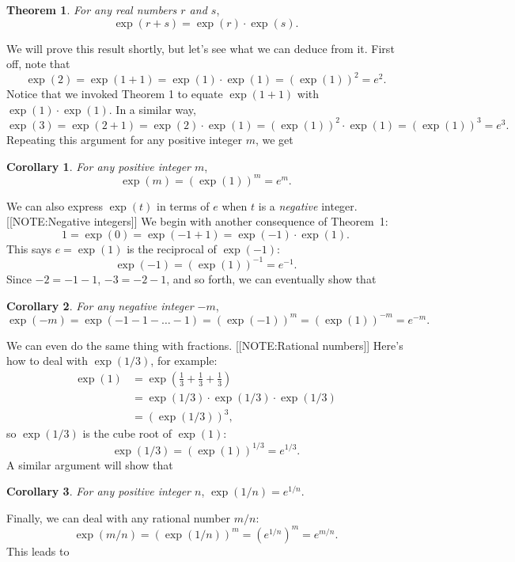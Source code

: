 {\bf Theorem 1}.  {\em For any real numbers\/ $r$ and\/ $s$},
	\[
\exp(r+s) = \exp(r) \cdot \exp(s).
\]

We will prove this result shortly, but let's see what we can deduce
from it.  First off, note that
\[
\exp(2) = \exp(1+1) = \exp(1) \cdot \exp(1) = 
		\left(\exp(1)\right)^2=e^2.
\]
Notice that we invoked Theorem 1 to equate $\exp(1+1)$ with $\exp(1) \cdot \exp(1)$.  In a similar way,
	\[
\exp(3) = \exp(2+1) = \exp(2) \cdot \exp(1) = 
		\left(\exp(1)\right)^2 \cdot \exp(1) = 
		\left(\exp(1)\right)^3=e^3.
\]
Repeating this argument for any positive integer $m$, we get



{\bf Corollary 1}.  {\em For any positive integer $m$},	\[
\exp(m) = \left(\exp(1)\right)^m = e^m.
\]

We can also express $\exp(t)$ in terms of $e $ when $t$ is a {\em
  negative\/} integer.
[[NOTE:Negative integers]]
We begin with another consequence of Theorem~1:
	\[
1 = \exp(0) = \exp(-1+1) = \exp(-1) \cdot \exp(1).
\]
This says $e = \exp(1)$ is the reciprocal of $\exp(-1)$:
	\[
\exp(-1) = \left(\exp(1)\right)^{-1} = e^{-1}.
\]
Since $-2 = -1 - 1$, $-3 = -2 - 1$, and so forth, we can eventually show that

\pagebreak



{\bf Corollary 2}.  {\em For any negative integer $-m$},	\[
\exp(-m) = \exp(-1-1-\ldots -1)=\left(\exp(-1)\right)^{m}=\left(\exp(1)\right)^{-m} = e^{-m}.
\]

	We can even do the same thing with fractions.  
	[[NOTE:Rational numbers]]
Here's how to deal with $\exp(1/3)$, for example:
	\begin{align*}
\exp(1) &= \exp\left(\tfrac{1}{3} 
		+ \tfrac{1}{3} + \tfrac{1}{3}\right)  \\
	&= \exp(1/3) \cdot \exp(1/3) \cdot \exp(1/3) \\
	&= \left( \exp(1/3) \right)^3,
	\end{align*}
so $\exp(1/3)$ is the cube root of $\exp(1)$:
	\[
\exp(1/3) = \left( \exp(1) \right)^{1/3} = e^{1/3}.
\]
A similar argument will show that 






{\bf Corollary 3}.  {\em For any positive integer $n$}, $\exp(1/n) =
e^{1/n}$.




Finally, we can deal with any rational number $m/n$:
	\[
\exp(m/n) = \left( \exp(1/n) \right)^m = 
		\left( e^{1/n} \right)^m = e^{m/n}.
\]
This leads to





